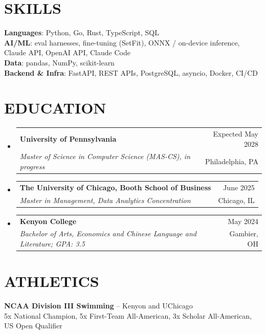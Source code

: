 \documentclass[letterpaper,11pt]{article}
\makeatletter
\newcommand{\resumeSubheading}[4]{
  \vspace{-1pt}\item
    \begin{tabular*}{\textwidth}[t]{l@{\extracolsep{\fill}}r}
      \textbf{#1} & {\color{dark-grey}\small #2}\vspace{1pt}\\
      \textit{#3} & {\color{dark-grey} \small #4}\\
    \end{tabular*}\vspace{-4pt}
}
\newcommand{\resumeSubHeadingListStart}{\begin{itemize}[leftmargin=0in, label={}]}
\newcommand{\resumeSubHeadingListEnd}{\end{itemize}}
\makeatother
\begin{document}
\section{SKILLS}
 \begin{itemize}[leftmargin=0in, label={}]
    \small{\item{
     \textbf{Languages}{: Python, Go, Rust, TypeScript, SQL}\vspace{2pt} \\
     \textbf{AI/ML}{: eval harnesses, fine-tuning (SetFit), ONNX / on-device inference, Claude API, OpenAI API, Claude Code}\vspace{2pt} \\
     \textbf{Data}{: pandas, NumPy, scikit-learn}\vspace{2pt} \\
     \textbf{Backend \& Infra}{: FastAPI, REST APIs, PostgreSQL, asyncio, Docker, CI/CD}
    }}
 \end{itemize}

\section{EDUCATION}
  \resumeSubHeadingListStart
    \resumeSubheading
      {University of Pennsylvania}{Expected May 2028}
      {Master of Science in Computer Science (MAS-CS), in progress}{Philadelphia, PA}
    \resumeSubheading
      {The University of Chicago, Booth School of Business}{June 2025}
      {Master in Management, Data Analytics Concentration}{Chicago, IL}
    \resumeSubheading
      {Kenyon College}{May 2024}
      {Bachelor of Arts, Economics and Chinese Language and Literature; GPA: 3.5}{Gambier, OH}
  \resumeSubHeadingListEnd

\section{ATHLETICS}
 \begin{itemize}[leftmargin=0in, label={}]
    \small{\item{
     \textbf{NCAA Division III Swimming} -- Kenyon and UChicago \\
     5x National Champion, 5x First-Team All-American, 3x Scholar All-American, US Open Qualifier
    }}
 \end{itemize}

\end{document}
